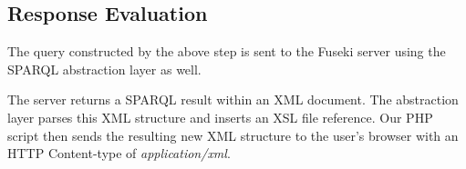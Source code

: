 \subsection{Response Evaluation}
The query constructed by the above step is sent to the Fuseki server using the SPARQL abstraction layer as well.

The server returns a SPARQL result within an XML document. The abstraction layer parses this XML structure and inserts an XSL file reference. Our PHP script then sends the resulting new XML structure to the user's browser with an HTTP Content-type of \textit{application/xml}.